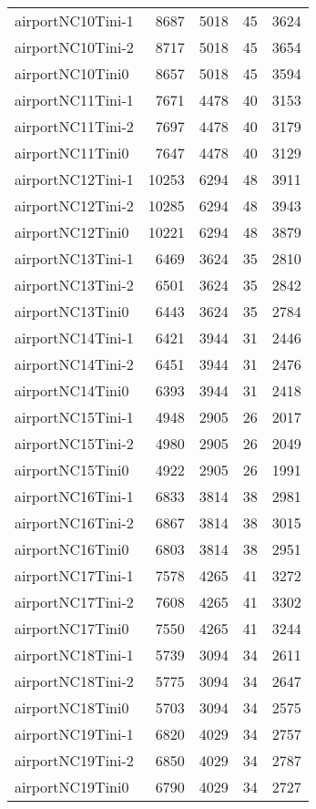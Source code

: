 \begin{longtable}{lrrrr}
airportNC10Tini-1 & 8687 & 5018 & 45 & 3624 \\
airportNC10Tini-2 & 8717 & 5018 & 45 & 3654 \\
airportNC10Tini0 & 8657 & 5018 & 45 & 3594 \\
airportNC11Tini-1 & 7671 & 4478 & 40 & 3153 \\
airportNC11Tini-2 & 7697 & 4478 & 40 & 3179 \\
airportNC11Tini0 & 7647 & 4478 & 40 & 3129 \\
airportNC12Tini-1 & 10253 & 6294 & 48 & 3911 \\
airportNC12Tini-2 & 10285 & 6294 & 48 & 3943 \\
airportNC12Tini0 & 10221 & 6294 & 48 & 3879 \\
airportNC13Tini-1 & 6469 & 3624 & 35 & 2810 \\
airportNC13Tini-2 & 6501 & 3624 & 35 & 2842 \\
airportNC13Tini0 & 6443 & 3624 & 35 & 2784 \\
airportNC14Tini-1 & 6421 & 3944 & 31 & 2446 \\
airportNC14Tini-2 & 6451 & 3944 & 31 & 2476 \\
airportNC14Tini0 & 6393 & 3944 & 31 & 2418 \\
airportNC15Tini-1 & 4948 & 2905 & 26 & 2017 \\
airportNC15Tini-2 & 4980 & 2905 & 26 & 2049 \\
airportNC15Tini0 & 4922 & 2905 & 26 & 1991 \\
airportNC16Tini-1 & 6833 & 3814 & 38 & 2981 \\
airportNC16Tini-2 & 6867 & 3814 & 38 & 3015 \\
airportNC16Tini0 & 6803 & 3814 & 38 & 2951 \\
airportNC17Tini-1 & 7578 & 4265 & 41 & 3272 \\
airportNC17Tini-2 & 7608 & 4265 & 41 & 3302 \\
airportNC17Tini0 & 7550 & 4265 & 41 & 3244 \\
airportNC18Tini-1 & 5739 & 3094 & 34 & 2611 \\
airportNC18Tini-2 & 5775 & 3094 & 34 & 2647 \\
airportNC18Tini0 & 5703 & 3094 & 34 & 2575 \\
airportNC19Tini-1 & 6820 & 4029 & 34 & 2757 \\
airportNC19Tini-2 & 6850 & 4029 & 34 & 2787 \\
airportNC19Tini0 & 6790 & 4029 & 34 & 2727 \\

\end{longtable}
